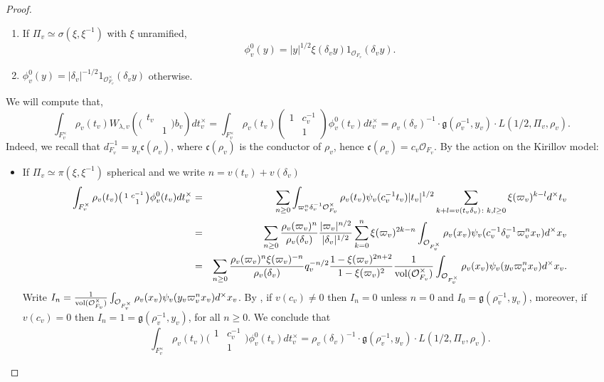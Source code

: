 \documentclass{amsart}
\theoremstyle{definition}
\theoremstyle{remark}
\numberwithin{equation}{section}
\newcommand{\cO}{{\mathcal O}}
\begin{document}
\begin{proof}
\begin{enumerate}
    \item If $\Pi_v\simeq\sigma(\xi,\xi^{-1})$ with $\xi$ unramified,
    \[
    \phi^0_v(y)=|y|^{1/2}\xi(\delta_vy)1_{\cO_{F_v}}(\delta_vy).
    \]

    \item $\phi^0_v(y)=|\delta_v|^{-1/2}1_{\cO^\times_{F_v}}(\delta_vy)$ otherwise.
\end{enumerate}
We will compute that, 
\[
    \int_{F_v^\times}\rho_v(t_v)W_{\lambda,v}\left(\big(\begin{smallmatrix}t_v     &  \\     & 1    
\end{smallmatrix}\big)b_v\right)dt_v^\times=\int_{F_v^\times}\rho_v(t_v)\left(\begin{array}{cc}
    1&c_v^{-1}\\&1
\end{array}\right)\phi_v^0(t_v)dt_v^\times=\rho_v(\delta_v)^{-1}\cdot\mathfrak{g}(\rho_v^{-1},y_v)\cdot L(1/2,\Pi_v, \rho_v).
    \]
Indeed, we recall that $d_{F_v}^{-1}=y_v\mathfrak{c}(\rho_v)$, where $\mathfrak{c}(\rho_v)$ is the conductor of $\rho_v$, hence $\mathfrak{c}(\rho_v)=c_v\cO_{F_v}$. By the action on the Kirillov model:
\begin{itemize}
\item If $\Pi_v\simeq\pi(\xi,\xi^{-1})$ spherical and we write $n=v(t_v)+v(\delta_v)$
    \begin{eqnarray*}
        \int_{F_v^\times}\rho_v(t_v)\big(\begin{smallmatrix}
    1&c^{-1}\\&1
\end{smallmatrix}\big)\phi_v^0(t_v)dt_v^\times&=&\sum_{n\geq 0}\int_{\varpi_v^{n}\delta_v^{-1}\cO_{F_v}^\times}\rho_v(t_v)\psi_v(c_v^{-1}t_v)|t_v|^{1/2}\sum_{k+l=v(t_v\delta_v)\colon k,l\geq 0}\xi(\varpi_v)^{k-l}d^\times t_v\\
        &=&\sum_{n\geq 0}\frac{\rho_v(\varpi_v)^{n}}{\rho_v(\delta_v)}\frac{|\varpi_v|^{n/2}}{|\delta_v|^{1/2}}\sum_{k= 0}^{n}\xi(\varpi_v)^{2k-n}\int_{\cO_{F_v^{\times}}}\rho_v(x_v)\psi_v(c_v^{-1}\delta_{v}^{-1}\varpi_v^{n}x_v)d^\times x_v\\
        &=&\sum_{n\geq 0}\frac{\rho_v(\varpi_v)^{n}\xi(\varpi_v)^{-n}}{\rho_v(\delta_v)}q_v^{-n/2}\frac{1-\xi(\varpi_v)^{2n+2}}{1-\xi(\varpi_v)^{2}}\frac{1}{{\rm vol}(\cO_{F_v}^\times)}\int_{\cO_{F_v^{\times}}}\rho_v(x_v)\psi_v(y_v\varpi_v^{n}x_v)d^\times x_v.        
    \end{eqnarray*}
    Write $I_n=\frac{1}{{\rm vol}(\cO_{F_v}^\times)}\int_{\cO_{F_v^{\times}}}\rho_v(x_v)\psi_v(y_v\varpi_v^{n}x_v)d^\times x_v$. By \cite[Lemma 2.2]{Spiess}, if $v(c_v)\neq 0$ then $I_n=0$ unless $n=0$ and $I_0=\mathfrak{g}(\rho_v^{-1},y_v)$, moreover, if $v(c_v)=0$ then $I_n=1=\mathfrak{g}(\rho_v^{-1},y_v)$, for all $n\geq 0$. We conclude that
    \[
    \int_{F_v^\times}\rho_v(t_v)\big(\begin{smallmatrix}
    1&c_v^{-1}\\&1
\end{smallmatrix}\big)\phi_v^0(t_v)dt_v^\times=\rho_v(\delta_v)^{-1}\cdot\mathfrak{g}(\rho_v^{-1},y_v)\cdot L(1/2,\Pi_v, \rho_v).
    \]


\end{itemize}
\end{proof}
\end{document}

